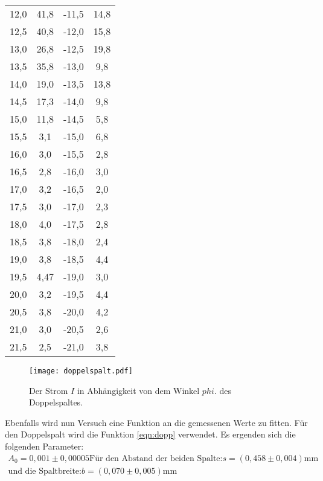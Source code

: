 \begin{table}
\begin{tabular}{c c c c}
    12,0 & 41,8  & -11,5 & 14,8 \\
    12,5 & 40,8  & -12,0 & 15,8 \\
    13,0 & 26,8  & -12,5 & 19,8 \\
    13,5 & 35,8  & -13,0 & 9,8 \\
    14,0 & 19,0  & -13,5 & 13,8 \\
    14,5 & 17,3  & -14,0 & 9,8  \\
    15,0 & 11,8  & -14,5 & 5,8  \\
    15,5 & 3,1   & -15,0 & 6,8  \\
    16,0 & 3,0   & -15,5 & 2,8  \\
    16,5 & 2,8   & -16,0 & 3,0  \\
    17,0 & 3,2   & -16,5 & 2,0  \\
    17,5 & 3,0   & -17,0 & 2,3  \\
    18,0 & 4,0   & -17,5 & 2,8  \\
    18,5 & 3,8   & -18,0 & 2,4  \\
    19,0 & 3,8   & -18,5 & 4,4  \\
    19,5 & 4,47  & -19,0 & 3,0  \\
    20,0 & 3,2   & -19,5 & 4,4  \\
    20,5 & 3,8   & -20,0 & 4,2  \\
    21,0 & 3,0   & -20,5 & 2,6  \\
    21,5 & 2,5   & -21,0 & 3,8  \\
    \bottomrule
    \end{tabular}
\end{table}

\begin{figure}
  \centering
  \texttt{[image: doppelspalt.pdf]}
  \caption{ Der Strom $I$ in Abhängigkeit von dem Winkel $phi$. des Doppelspaltes.}
  \label{fig:dopp}
\end{figure}
Ebenfalls wird nun Versuch eine Funktion an die gemessenen Werte zu fitten.
Für den Doppelspalt wird die Funktion \eqref{eqn:dopp} verwendet.
Es ergenden sich die folgenden
Parameter:
\begin{align*}
  A_0=0,001\pm0,00005
  \text{Für den Abstand der beiden Spalte:}  s=(0,458\pm0,004)\si{\milli\meter}\\
  \text{und die Spaltbreite:} b=(0,070\pm0,005)\si{\milli\meter}\\
\end{align*}
